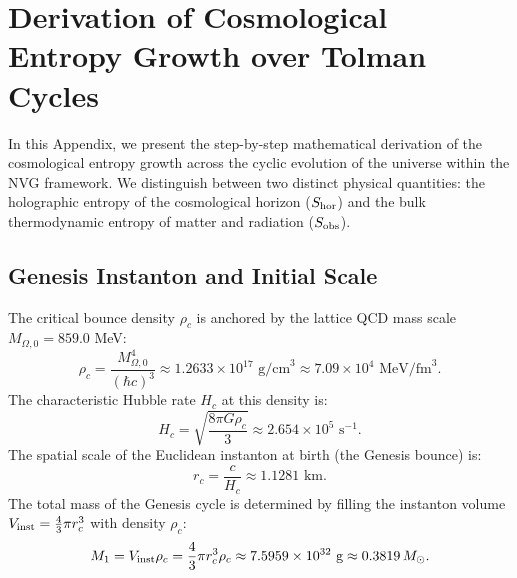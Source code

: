\documentclass[12pt,a4paper]{article}
\theoremstyle{plain}
\theoremstyle{definition}
\theoremstyle{remark}
\begin{document}
\appendix
\section{Derivation of Cosmological Entropy Growth over Tolman Cycles}\label{app:entropy}

In this Appendix, we present the step-by-step mathematical derivation of the cosmological entropy growth across the cyclic evolution of the universe within the NVG framework. We distinguish between two distinct physical quantities: the holographic entropy of the cosmological horizon ($S_{\rm hor}$) and the bulk thermodynamic entropy of matter and radiation ($S_{\rm obs}$).

\subsection{Genesis Instanton and Initial Scale}
The critical bounce density $\rho_c$ is anchored by the lattice QCD mass scale $M_{\Omega,0} = 859.0$ MeV:
\begin{equation}
  \rho_c = \frac{M_{\Omega,0}^4}{(\hbar c)^3} \approx 1.2633 \times 10^{17} \text{ g/cm}^3 \approx 7.09 \times 10^4 \text{ MeV/fm}^3.
\end{equation}
The characteristic Hubble rate $H_c$ at this density is:
\begin{equation}
  H_c = \sqrt{\frac{8\pi G \rho_c}{3}} \approx 2.654 \times 10^5 \text{ s}^{-1}.
\end{equation}
The spatial scale of the Euclidean instanton at birth (the Genesis bounce) is:
\begin{equation}
  r_c = \frac{c}{H_c} \approx 1.1281 \text{ km}.
\end{equation}
The total mass of the Genesis cycle is determined by filling the instanton volume $V_{\rm inst} = \frac{4}{3}\pi r_c^3$ with density $\rho_c$:
\begin{equation}
  M_1 = V_{\rm inst} \rho_c = \frac{4}{3}\pi r_c^3 \rho_c \approx 7.5959 \times 10^{32} \text{ g} \approx 0.3819 \, M_\odot.
\end{equation}
\end{document}
